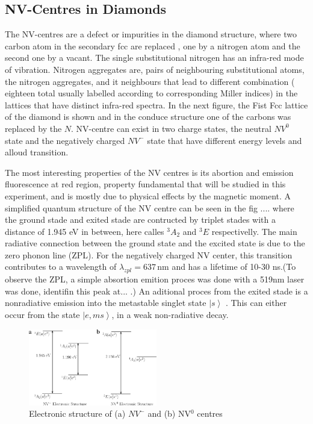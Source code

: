 \subsection{NV-Centres in Diamonds}
\label{sec:nvcentres}
 The NV-centres are a defect or impurities in the diamond structure, where two carbon atom in the secondary fcc are replaced , one by a nitrogen atom and the second one by a  vacant. The single substitutional nitrogen has an infra-red mode of vibration. Nitrogen aggregates are, pairs of neighbouring substitutional atoms, the nitrogen aggregates, and it neighbours that lead to different combination ( eighteen total usually labelled according to corresponding Miller indices) in the lattices that have distinct infra-red spectra. In the next figure, the Fist Fcc lattice of the diamond is shown and in the conduce structure one of the carbons was replaced by the $N$. NV-centre can exist in two charge states, the neutral $NV^{0}$ state and the negatively charged $NV^{-}$ state that have different energy levels and alloud transition.
 
The most interesting properties of the NV centres is its abortion and emission fluorescence at red region, property fundamental that will be studied in this experiment, and is mostly due to physical effects by the magnetic moment. A simplified quantum structure of the NV centre can be seen in the fig .... where the ground stade and exited stade are contructed by triplet stades with a distance of 1.945 eV in between, here calles $^{3}A_{2}$ and $^{3}E$  respectivelly. The main radiative connection between the ground state and the excited state is due to the zero phonon line (ZPL). For the negatively charged NV center, this transition contributes to a wavelength of $\lambda_{zpl} = 637\,\mathrm{nm}$ and has a lifetime of 10-30 ns.(To observe the ZPL, a simple absortion emition proces was done with a 519nm laser was done, identifin this peak at... .) 
An aditional proces from the exited stade is a nonradiative emission into the metastable singlet state $\left|s\right\rangle$ . This can either occur from the state $\left| e,ms\right\rangle$, in a weak non-radiative decay.

\begin{figure}
	\centering
	\includegraphics[width=0.5\textwidth]{../figures/nv-centre.png}
	\caption{Electronic structure of (a) $NV^-$ and (b) NV$^0$ centres \cite{doherty}}
	\label{fig:nvcentres}
\end{figure}


